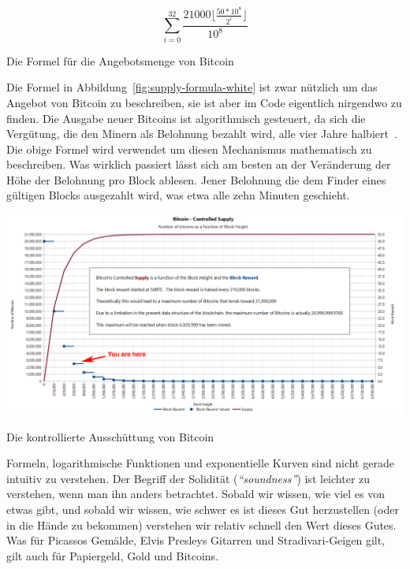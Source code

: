 \begin{center}
  \centering
  \begin{equation}
  \sum\limits_{i=0}^{32} \frac{21000 \lfloor \frac{50*10^8}{2^i} \rfloor}{10^8}
  \end{equation}
  \caption{Die Formel für die Angebotsmenge von Bitcoin}
  \label{fig:supply-formula-white}
\end{center}

Die Formel in Abbildung~\ref{fig:supply-formula-white} ist zwar nützlich um das
Angebot von Bitcoin zu beschreiben, sie ist aber im Code eigentlich nirgendwo zu
finden. Die Ausgabe neuer Bitcoins ist algorithmisch gesteuert, da sich die
Vergütung, die den Minern als Belohnung bezahlt wird, alle vier Jahre
halbiert~\cite{btcwiki:supply}. Die obige Formel wird verwendet um diesen
Mechanismus mathematisch zu beschreiben. Was wirklich passiert lässt sich am
besten an der Veränderung der Höhe der Belohnung pro Block ablesen. Jener
Belohnung die dem Finder eines gültigen Blocks ausgezahlt wird, was etwa alle zehn
Minuten geschieht.

\begin{center}
  \includegraphics[width=\textwidth]{assets/images/you-are-here.png}
  \caption{Die kontrollierte Ausschüttung von Bitcoin}
  \label{fig:you-are-here.png}
\end{center}

Formeln, logarithmische Funktionen und exponentielle Kurven sind nicht gerade
intuitiv zu verstehen. Der Begriff der Solidität (\textit{\enquote{soundness}})
ist leichter zu verstehen, wenn man ihn anders betrachtet. Sobald wir wissen, wie
viel es von etwas gibt, und sobald wir wissen, wie schwer es ist dieses Gut
herzustellen (oder in die Hände zu bekommen) verstehen wir relativ schnell den
Wert dieses Gutes. Was für Picassos Gemälde, Elvis Presleys Gitarren und
Stradivari-Geigen gilt, gilt auch für Papiergeld, Gold und Bitcoins.

